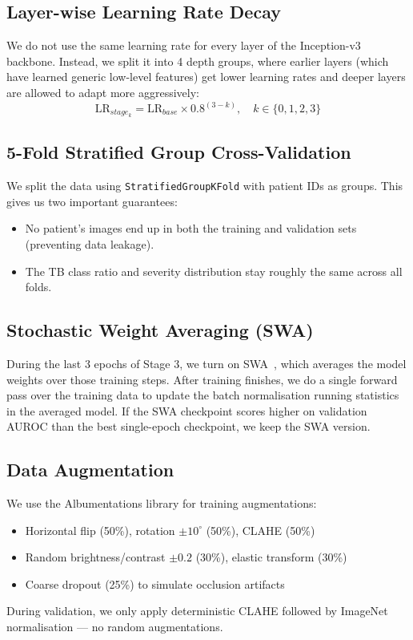 \documentclass[12pt]{report}
\begin{document}
\subsection{Layer-wise Learning Rate Decay}
We do not use the same learning rate for every layer of the Inception-v3 backbone. Instead, we split it into 4 depth groups, where earlier layers (which have learned generic low-level features) get lower learning rates and deeper layers are allowed to adapt more aggressively:
\begin{equation}
\text{LR}_{stage_k} = \text{LR}_{base} \times 0.8^{(3-k)}, \quad k \in \{0,1,2,3\}
\end{equation}

\subsection{5-Fold Stratified Group Cross-Validation}
We split the data using \texttt{StratifiedGroupKFold} with patient IDs as groups. This gives us two important guarantees:
\begin{itemize}
    \item No patient's images end up in both the training and validation sets (preventing data leakage).
    \item The TB class ratio and severity distribution stay roughly the same across all folds.
\end{itemize}

\subsection{Stochastic Weight Averaging (SWA)}
During the last 3 epochs of Stage 3, we turn on SWA~\cite{ref14}, which averages the model weights over those training steps. After training finishes, we do a single forward pass over the training data to update the batch normalisation running statistics in the averaged model. If the SWA checkpoint scores higher on validation AUROC than the best single-epoch checkpoint, we keep the SWA version.

\subsection{Data Augmentation}
We use the Albumentations library for training augmentations:
\begin{itemize}
    \item Horizontal flip (50\%), rotation $\pm 10^\circ$ (50\%), CLAHE (50\%)
    \item Random brightness/contrast $\pm 0.2$ (30\%), elastic transform (30\%)
    \item Coarse dropout (25\%) to simulate occlusion artifacts
\end{itemize}
During validation, we only apply deterministic CLAHE followed by ImageNet normalisation --- no random augmentations.
\end{document}
